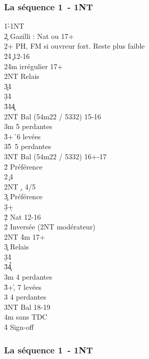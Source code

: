 \documentclass[a4paper]{article}
\begin{document}
\subsubsection{La séquence 1\pdfh\ - 1NT}

\begin{bidtable}
1\h-1NT\\
2\c \> Gazilli : Nat ou 17+\+\\
2\d {}+ PH, FM si ouvreur fort. Reste plus faible\+\\
2\h {}\h 4\c\ 12-16\\
2\s {}\h 4m irrégulier 17+\+\\
2NT \> Relais\+\\
3\c {}\h 4\c \\
3\d {}\h 4\d \\
3\h {}\h 4\d 4\c \-\-\\
2NT \> Bal (54m22 / 5332) 15-16\\
3m  5 perdantes\\
3\h {}+\h\ 6 levées\\
3\s {}\h 5\s\ 5 perdantes\\
3NT \> Bal (54m22 / 5332) 16+-17\-\\
2\h \> Préférence\\
2\s {}\c\ 4\d \\
2NT \d , 4/5\c \\
3\c \> Préférence\\
3\d {}+\d \-\\
2\d\h \> Nat 12-16\\
2\s \> Inversée (2NT modérateur)\\
2NT \h 4m 17+\+\\
3\c \> Relais\+\\
3\d {}\h 4\d \\
3\h {}\h 4\c \-\-\\
3m  4 perdantes\\
3\h {}+\h , 7 levées\\
3\s {} 4 perdantes\\
3NT \> Bal 18-19\\
4m  sans TDC\\
4\h \> Sign-off
\end{bidtable}

\subsubsection{La séquence 1\pdfs\ - 1NT}
\end{document}
